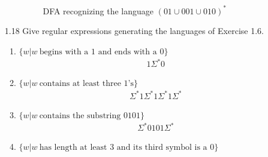 \begin{enumerate}
\begin{enumerate}
\begin{figure}[H]
                        \caption{DFA recognizing the language $(01 \cup 001 \cup 010)^\ast$}
                    \end{figure}
          \end{enumerate}
    \item [1.18]
          Give regular expressions generating the languages of Exercise 1.6.
          \begin{enumerate}
              \item $\{w|w~ \text{begins with a }1\text{ and ends with a }0\}$
                    \begin{align*}
                        1\Sigma^*0
                    \end{align*}
              \item $\{w|w~ \text{contains at least three }1\text{'s}\}$
                    \begin{align*}
                        \Sigma^*1\Sigma^*1\Sigma^*1\Sigma^*
                    \end{align*}
              \item $\{w|w~ \text{contains the substring }0101\}$
                    \begin{align*}
                        \Sigma^*0101\Sigma^*
                    \end{align*}
              \item $\{w|w~ \text{has length at least }3\text{ and its third symbol is a }0\}$

\end{enumerate}
\end{enumerate}
